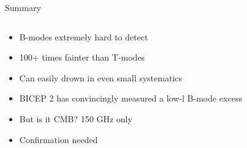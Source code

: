 \documentclass{beamer}
\begin{document}
\begin{frame}{Summary}
	\begin{columns}
		\begin{column}{8cm}
			\begin{itemize}
				\item<2-> B-modes extremely hard to detect
				\item<3-> 100+ times fainter than T-modes
				\item<4-> Can easily drown in even small systematics
				\item<5-> BICEP 2 has convincingly measured a low-l B-mode
					excess
				\item<6-> But is it CMB? 150 GHz only
				\item<7-> Confirmation needed
			\end{itemize}
		\end{column}
		\begin{column}{4cm}
\end{column}
\end{columns}
\end{frame}
\end{document}
